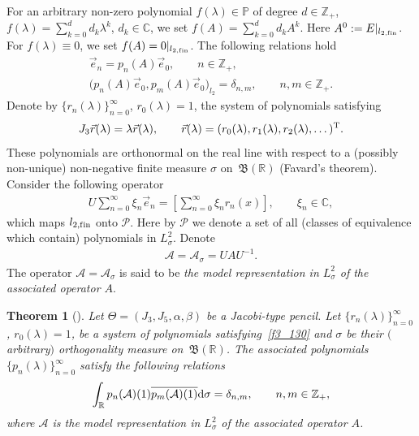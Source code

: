 \documentclass[pdftex]{sigma}
\numberwithin{equation}{section}
\newtheorem{Theorem}{Theorem}[section]
\begin{document}
For an arbitrary non-zero polynomial $f(\lambda)\in\mathbb{P}$ of degree $d\in\mathbb{Z}_+$, $f(\lambda) = \sum\limits_{k=0}^d d_k \lambda^k$, $d_k\in\mathbb{C}$, we set $f(A) = \sum\limits_{k=0}^d d_k A^k$. Here $A^0 := E|_{l_{2,{\rm f\/in}}}$. For $f(\lambda) \equiv 0$, we set $f(A) = 0|_{l_{2,{\rm f\/in}}}$. The following relations hold~\cite{cit_95000_Z}
\begin{gather}\label{f3_110}
\vec e_n = p_n(A) \vec e_0,\qquad n\in\mathbb{Z}_+,\\
\label{f3_120} \big( p_n(A) \vec e_0, p_m(A) \vec e_0 \big)_{l_2} = \delta_{n,m},\qquad n,m\in\mathbb{Z}_+.
\end{gather}
Denote by $\{ r_n(\lambda) \}_{n=0}^\infty$, $r_0(\lambda) = 1$, the system of polynomials satisfying
\begin{gather}
\label{f3_130}
J_3 \vec r(\lambda) = \lambda \vec r(\lambda),\qquad \vec r(\lambda) = (r_0(\lambda), r_1(\lambda),r_2(\lambda), \dots )^{\rm T}.
\end{gather}
These polynomials are orthonormal on the real line with respect to a (possibly non-unique) non-negative f\/inite measure $\sigma$ on~$\mathfrak{B}(\mathbb{R})$ (Favard's theorem). Consider the following operator
\begin{gather}\label{f3_140}
U \sum_{n=0}^\infty \xi_n \vec e_n = \left[ \sum_{n=0}^\infty \xi_n r_n(x) \right ],\qquad \xi_n\in\mathbb{C},
\end{gather}
which maps $l_{2,{\rm f\/in}}$ onto $\mathcal{P}$. Here by $\mathcal{P}$ we denote a set of all (classes of equivalence which contain) polynomials in $L^2_\sigma$. Denote
\begin{gather} \label{f3_150}
\mathcal{A} = \mathcal{A}_\sigma = U A U^{-1}.
\end{gather}
The operator $\mathcal{A} = \mathcal{A}_\sigma$ is said to be \textit{the model representation in $L^2_\sigma$ of the associated operator $A$}.

\begin{Theorem}[\cite{cit_95000_Z}]\label{t3_1} Let $\Theta = (J_3, J_5, \alpha, \beta)$ be a Jacobi-type pencil. Let $\{ r_n(\lambda) \}_{n=0}^\infty$, $r_0(\lambda) = 1$, be a system of polynomials satisfying~\eqref{f3_130} and $\sigma$ be their $($arbitrary$)$ orthogonality measure on~$\mathfrak{B}(\mathbb{R})$. The associated polynomials $\{ p_n(\lambda) \}_{n=0}^\infty$ satisfy the following relations
\begin{gather}\label{f3_160}
\int_{\mathbb{R}} p_n(\mathcal{A})(1) \overline{ p_m(\mathcal{A})(1) } {\rm d}\sigma = \delta_{n,m},\qquad n,m\in\mathbb{Z}_+,
\end{gather}
where $\mathcal{A}$ is the model representation in $L^2_\sigma$ of the associated operator $A$.
\end{Theorem}
\end{document}

